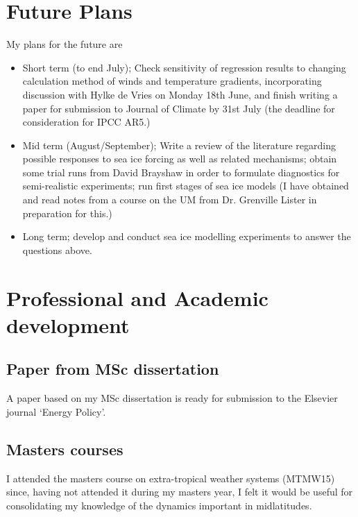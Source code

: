\documentclass [11pt,a4paper,twosided] {report}
\begin{document}
\section*{Future Plans}
My plans for the future are 
\begin{itemize}
\item Short term (to end July); Check sensitivity of regression results to changing calculation method of winds and temperature gradients, incorporating discussion with Hylke de Vries on Monday 18th June, and finish writing a paper for submission to Journal of Climate by 31st July (the deadline for consideration for IPCC AR5.)
\item Mid term (August/September); Write a review of the literature regarding possible responses to sea ice forcing as well as related mechanisms; obtain some trial runs from David Brayshaw in order to formulate diagnostics for semi-realistic experiments; run first stages of sea ice models (I have obtained and read notes from a course on the UM from Dr. Grenville Lister in preparation for this.)
\item Long term; develop and conduct sea ice modelling experiments to answer the questions above. 
\end{itemize}

\section*{Professional and Academic development}

\subsection*{Paper from MSc dissertation}
A paper based on my MSc dissertation is ready for submission to the Elsevier journal ‘Energy Policy’.

\subsection*{Masters courses}
I attended the masters course on extra-tropical weather systems (MTMW15) since, having not attended it during my masters year, I felt it would be useful for consolidating my knowledge of the dynamics important in midlatitudes.
\end{document}
